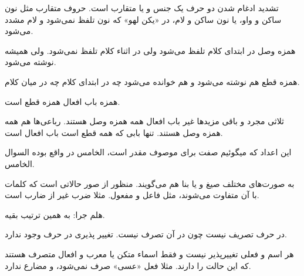\documentclass{article}
\begin{document}
\begin{addpage}{3}
  \vspace*{5cm}
  \begin{note}
    تشدید ادغام شدن دو حرف یک جنس و یا متقارب است. حروف متقارب مثل نون ساکن و واو، یا نون ساکن و لام، در «یکن لهو» که نون تلفظ نمی‌شود و لام مشدد می‌شود.
  \end{note}
  \begin{note}
    همزه وصل در ابتدای کلام تلفظ می‌شود ولی در اثناء کلام تلفظ نمی‌شود. ولی همیشه نوشته می‌شود.
  \end{note}
  \begin{note}
    همزه قطع هم نوشته می‌شود و هم خوانده می‌شود چه در ابتدای کلام چه در میان کلام.
  \end{note}
  \begin{note}
    همزه باب افعال همزه قطع است.
  \end{note}
  \begin{note}
    ثلاثی مجرد و باقی مزیدها غیر باب افعال همه همزه وصل هستند. رباعی‌ها هم همه همزه وصل هستند. تنها بابی که همه قطع است باب افعال است.
  \end{note}

\end{addpage}

\begin{addpage}{4}
  \vspace*{10cm}
  \begin{note}
    این اعداد که میگوئیم صفت برای موصوف مقدر است، الخامس در واقع بوده السوال الخامس.
  \end{note}
  \begin{note}
    به صورت‌های مختلف صیغ و یا بنا هم می‌گویند. منظور از صور حالاتی است که کلمات با آن متفاوت می‌شوند، مثل فاعل و مفعول. مثلا ضرب غیر از ضارب است.
    
    هلم جرا: به همین ترتیب بقیه.
  \end{note}
  \vspace*{6cm}
  \begin{note}
    در حرف تصریف نیست چون در آن تصرف نیست. تغییر پذیری در حرف وجود ندارد.
  \end{note}
  \vspace*{3.5cm}
  \begin{note}
    هر اسم و فعلی تغییرپذیر نیست و فقط اسماء متکن یا معرب و افعال متصرف هستند که این حالت را دارند. مثلا فعل «عسی» صرف نمی‌شود، و مضارع ندارد.
  \end{note}
\end{addpage}
\end{document}

